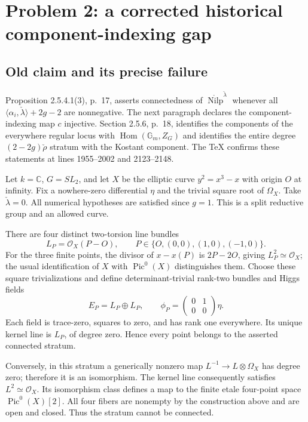 \documentclass[10pt]{article}
\begin{document}
\section*{Problem 2: a corrected historical component-indexing gap}
\subsection*{Old claim and its precise failure}
Proposition 2.5.4.1(3), p. 17, asserts connectedness of \(\mathring{\operatorname{Nilp}}^{\check\lambda}\) whenever all \(\langle\alpha_i,\check\lambda\rangle+2g-2\) are nonnegative. The next paragraph declares the component-indexing map \(c\) injective. Section 2.5.6, p. 18, identifies the components of the everywhere regular locus with \(\operatorname{Hom}(\mathbb G_m,Z_G)\) and identifies the entire degree \((2-2g)\check\rho\) stratum with the Kostant component. The TeX confirms these statements at lines 1955–2002 and 2123–2148.\par
Let \(k=\mathbb C\), \(G=SL_2\), and let \(X\) be the elliptic curve \(y^2=x^3-x\) with origin \(O\) at infinity. Fix a nowhere-zero differential \(\eta\) and the trivial square root of \(\Omega_X\). Take \(\check\lambda=0\). All numerical hypotheses are satisfied since \(g=1\). This is a split reductive group and an allowed curve.\par
There are four distinct two-torsion line bundles \[L_P=\mathcal O_X(P-O),\qquad
 P\in\{O,(0,0),(1,0),(-1,0)\}.\] For the three finite points, the divisor of \(x-x(P)\) is \(2P-2O\), giving \(L_P^2\simeq\mathcal O_X\); the usual identification of \(X\) with \(\operatorname{Pic}^0(X)\) distinguishes them. Choose these square trivializations and define determinant-trivial rank-two bundles and Higgs fields \[E_P=L_P\oplus L_P,\qquad
 \phi_P=\begin{pmatrix}0&1\\0&0\end{pmatrix}\eta.\] Each field is trace-zero, squares to zero, and has rank one everywhere. Its unique kernel line is \(L_P\), of degree zero. Hence every point belongs to the asserted connected stratum.\par
Conversely, in this stratum a generically nonzero map \(L^{-1}\to L\otimes\Omega_X\) has degree zero; therefore it is an isomorphism. The kernel line consequently satisfies \(L^2\simeq
\mathcal O_X\). Its isomorphism class defines a map to the finite etale four-point space \(\operatorname{Pic}^0(X)[2]\). All four fibers are nonempty by the construction above and are open and closed. Thus the stratum cannot be connected.\par
\end{document}
